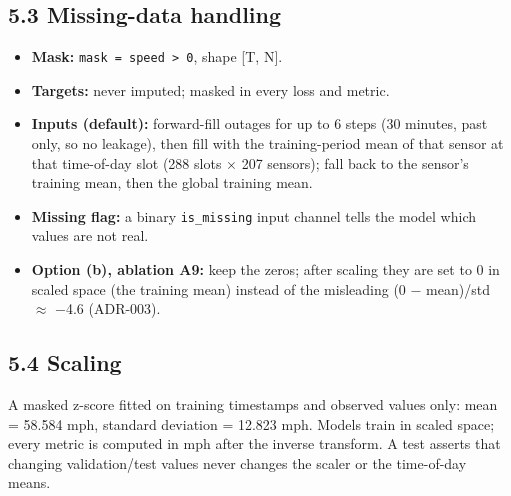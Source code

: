\documentclass[10pt,a4paper]{article}
\begin{document}
\subsection*{5.3 Missing-data handling}
\begin{itemize}[nosep,leftmargin=*]
\item \textbf{Mask:} \texttt{mask = speed > 0}, shape [T, N].
\item \textbf{Targets:} never imputed; masked in every loss and metric.
\item \textbf{Inputs (default):} forward-fill outages for up to 6 steps (30 minutes, past only, so no leakage), then fill with the training-period mean of that sensor at that time-of-day slot (288 slots \ensuremath{\times} 207 sensors); fall back to the sensor's training mean, then the global training mean.
\item \textbf{Missing flag:} a binary \texttt{is\_\allowbreak{}missing} input channel tells the model which values are not real.
\item \textbf{Option (b), ablation A9:} keep the zeros; after scaling they are set to 0 in scaled space (the training mean) instead of the misleading (0 \ensuremath{-} mean)/\allowbreak{}std \ensuremath{\approx} \ensuremath{-}4.6 (ADR-003).
\end{itemize}

\subsection*{5.4 Scaling}
A masked z-score fitted on training timestamps and observed values only: mean = 58.584 mph, standard deviation = 12.823 mph. Models train in scaled space; every metric is computed in mph after the inverse transform. A test asserts that changing validation/\allowbreak{}test values never changes the scaler or the time-of-day means.
\end{document}

